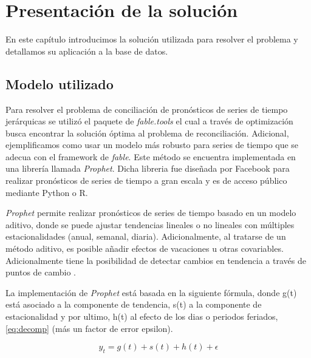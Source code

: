 \chapter{Presentación de la solución}

En este capítulo introducimos la solución utilizada para resolver el problema y detallamos su aplicación a la base de datos.

\section{Modelo utilizado}


Para resolver el problema de conciliación de pronósticos de series de tiempo jerárquicas se utilizó el paquete de \textit{fable.tools} el cual a través de optimización busca encontrar la solución óptima al problema de reconciliación. Adicional, ejemplificamos como usar un modelo más robusto para series de tiempo que se adecua con el framework de \textit{fable}. Este método se encuentra implementada en una librería llamada \textit{Prophet}. Dicha libreria fue diseñada por Facebook para realizar pronósticos de series de tiempo a gran escala y es de acceso público mediante Python o R. 

\textit{Prophet} permite realizar pronósticos de series de tiempo basado en un modelo aditivo, donde se puede ajustar tendencias lineales o no lineales con múltiples estacionalidades (anual, semanal, diaria). Adicionalmente, al tratarse de un método aditivo, es posible añadir efectos de vacaciones u otras covariables. Adicionalmente tiene la posibilidad de detectar cambios en tendencia a través de puntos de cambio \cite{taylor2018forecasting}.

La implementación de \textit{Prophet} está basada en la siguiente fórmula, donde g(t) está asociado a la componente de tendencia, s(t) a la componente de estacionalidad y por ultimo, h(t) al efecto de los dias o periodos feriados,  \ref{eq:decomp} (más un factor de error epsilon).

\begin{equation}
    y_t = g(t) + s(t) + h(t) + \epsilon
    \label{eq:decomp}
\end{equation}

